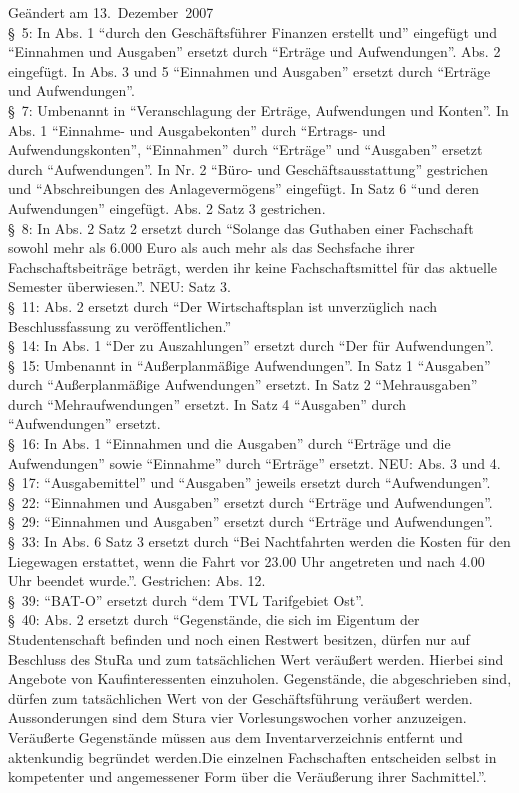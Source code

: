 Geändert am 13.~Dezember~2007\\
§~5: In Abs. 1 "`durch den Geschäftsführer Finanzen erstellt und"' eingefügt und "`Einnahmen und Ausgaben"' ersetzt durch "`Erträge und Aufwendungen"'. Abs. 2 eingefügt. In Abs. 3 und 5 "`Einnahmen und Ausgaben"' ersetzt durch "`Erträge und Aufwendungen"'.\\
§~7: Umbenannt in "`Veranschlagung der Erträge, Aufwendungen und Konten"'. In Abs. 1 "`Einnahme- und Ausgabekonten"' durch "`Ertrags- und Aufwendungskonten"', "`Einnahmen"' durch "`Erträge"' und "`Ausgaben"' ersetzt durch "`Aufwendungen"'. In Nr. 2 "`Büro- und  Geschäftsausstattung"' gestrichen und "`Abschreibungen des Anlagevermögens"' eingefügt. In Satz 6 "`und deren Aufwendungen"' eingefügt. Abs. 2 Satz 3 gestrichen.\\
§~8: In Abs. 2 Satz 2 ersetzt durch "`Solange das Guthaben einer Fachschaft sowohl mehr als 6.000 Euro als auch mehr als das Sechsfache ihrer Fachschaftsbeiträge beträgt, werden ihr keine Fachschaftsmittel für das aktuelle Semester überwiesen."'. NEU: Satz 3.\\
§~11: Abs. 2 ersetzt durch "`Der Wirtschaftsplan ist unverzüglich nach Beschlussfassung zu veröffentlichen."'\\
§~14: In Abs. 1 "`Der zu Auszahlungen"' ersetzt durch "`Der für Aufwendungen"'.\\
§~15: Umbenannt in "`Außerplanmäßige Aufwendungen"'. In Satz 1 "`Ausgaben"' durch "`Außerplanmäßige Aufwendungen"' ersetzt. In Satz 2 "`Mehrausgaben"' durch "`Mehraufwendungen"' ersetzt. In Satz 4 "`Ausgaben"' durch "`Aufwendungen"' ersetzt.\\
§~16: In Abs. 1 "`Einnahmen und die Ausgaben"' durch "`Erträge und die Aufwendungen"' sowie "`Einnahme"' durch "`Erträge"' ersetzt. NEU: Abs. 3 und 4.\\
§~17: "`Ausgabemittel"' und "`Ausgaben"' jeweils ersetzt durch "`Aufwendungen"'.\\
§~22: "`Einnahmen und Ausgaben"' ersetzt durch "`Erträge und Aufwendungen"'.\\
§~29: "`Einnahmen und Ausgaben"' ersetzt durch "`Erträge und Aufwendungen"'.\\
§~33: In Abs. 6 Satz 3 ersetzt durch "`Bei Nachtfahrten werden die Kosten für den Liegewagen erstattet, wenn die Fahrt vor 23.00 Uhr angetreten und nach 4.00 Uhr beendet wurde."'. Gestrichen: Abs. 12.\\
§~39: "`BAT-O"' ersetzt durch "`dem TVL Tarifgebiet Ost"'.\\
§~40: Abs. 2 ersetzt durch "`Gegenstände, die sich im Eigentum der Studentenschaft befinden und noch einen Restwert  besitzen, dürfen nur auf Beschluss des StuRa und zum tatsächlichen Wert veräußert werden. Hierbei sind Angebote von Kaufinteressenten einzuholen. Gegenstände, die abgeschrieben sind, dürfen zum tatsächlichen Wert von der Geschäftsführung veräußert werden. Aussonderungen sind dem Stura vier Vorlesungswochen vorher anzuzeigen. Veräußerte Gegenstände müssen aus dem Inventarverzeichnis entfernt und aktenkundig begründet werden.Die einzelnen Fachschaften entscheiden selbst in kompetenter und angemessener Form über die Veräußerung ihrer Sachmittel."'.

